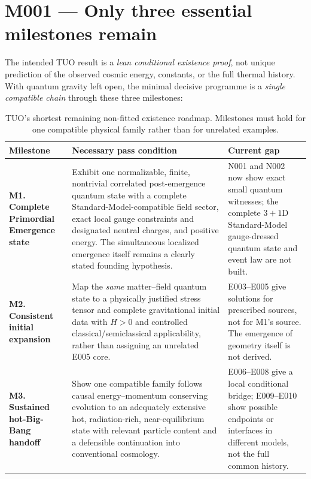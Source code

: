 \documentclass[11pt,a4paper]{article}
\theoremstyle{tmon}
\theoremstyle{definition}
\begin{document}
\section{M001 --- Only three essential milestones remain}\label{sec:m001}
The intended TUO result is a \emph{lean conditional existence proof}, not unique prediction of the observed cosmic energy, constants, or the full thermal history. With quantum gravity left open, the minimal decisive programme is a \emph{single compatible chain} through these three milestones:
\begin{table}[htbp]\centering\small
\begin{tabularx}{\linewidth}{@{}p{.21\linewidth}Yp{.26\linewidth}@{}}\toprule
\textbf{Milestone} & \textbf{Necessary pass condition} & \textbf{Current gap}\\\midrule
\textbf{M1. Complete Primordial Emergence state} & Exhibit one normalizable, finite, nontrivial correlated post-emergence quantum state with a complete Standard-Model-compatible field sector, exact local gauge constraints and designated neutral charges, and positive energy. The simultaneous localized emergence itself remains a clearly stated founding hypothesis. & N001 and N002 now show exact small quantum witnesses; the complete $3+1$D Standard-Model gauge-dressed quantum state and event law are not built.\\
\textbf{M2. Consistent initial expansion} & Map the \emph{same} matter--field quantum state to a physically justified stress tensor and complete gravitational initial data with $H>0$ and controlled classical/semiclassical applicability, rather than assigning an unrelated E005 core. & E003--E005 give solutions for prescribed sources, not for M1's source. The emergence of geometry itself is not derived.\\
\textbf{M3. Sustained hot-Big-Bang handoff} & Show one compatible family follows causal energy--momentum conserving evolution to an adequately extensive hot, radiation-rich, near-equilibrium state with relevant particle content and a defensible continuation into conventional cosmology. & E006--E008 give a local conditional bridge; E009--E010 show possible endpoints or interfaces in different models, not the full common history.\\\bottomrule
\end{tabularx}
\caption{TUO's shortest remaining non-fitted existence roadmap. Milestones must hold for one compatible physical family rather than for unrelated examples.}\label{tab:m001}
\end{table}
\end{document}
